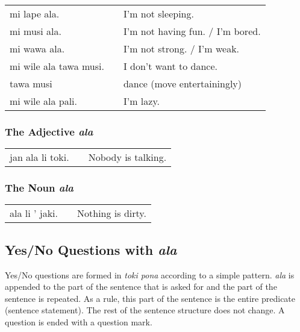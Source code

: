 \begin{supertabular}{p{5,5cm}|ll}
mi lape ala. && I'm not sleeping. \\ 
mi musi ala. && I'm not having fun. / I'm bored. \\
mi wawa ala. && I'm not strong. / I'm weak. \\
mi wile ala tawa musi. && I don't want to dance. \\
tawa musi && dance (move entertainingly) \\
mi wile ala pali. && I'm lazy. \\
\end{supertabular} 

%
\subsubsection*{The Adjective \textit{ala}}
%
%
\begin{supertabular}{p{5,5cm}|ll}
jan ala li toki. && Nobody is talking. \\
\end{supertabular} 

%
\subsubsection*{The Noun \textit{ala}}
%
%

\begin{supertabular}{p{5,5cm}|ll}
ala li ' jaki. && Nothing is dirty. \\
\end{supertabular} 

%
%
\subsection*{Yes/No Questions with \textit{ala}}
%
%

Yes/No questions are formed in \textit{toki pona} according to a simple pattern.
\textit{ala} is appended to the part of the sentence that is asked for and the part of the sentence is repeated.
As a rule, this part of the sentence is the entire predicate (sentence statement).
The rest of the sentence structure does not change.
A question is ended with a question mark.

